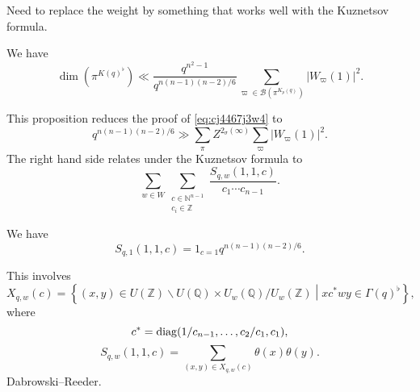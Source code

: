 \documentclass[reqno]{amsart} 
\begin{document}
Need to replace the weight by something that works well with the Kuznetsov formula.

\begin{proposition}
  We have
  \begin{equation*}
    \dim \left( \pi^{K (q)^\flat } \right)
    \ll
    \frac{q^{n^2 - 1}}{q^{n (n - 1) (n - 2)/6}}
    \sum_{\varpi \in \mathcal{B} (\pi^{K_p (q)})}
    \left\lvert W_\varpi (1)  \right\rvert^2.
  \end{equation*}
  
\end{proposition}

This proposition reduces the proof of \eqref{eq:cj4467j3w4} to
\begin{equation*}
  q^{n (n - 1 ) (n - 2) / 6} \gg \sum_\pi Z^{2_\sigma (\infty) }
  \sum_{\varpi} \left\lvert W_\varpi (1)  \right\rvert^2 .
\end{equation*}
The right hand side relates under the Kuznetsov formula to
\begin{equation*}
  \sum_{w \in W}
  \sum_{
    \substack{
      c \in \mathbb{N}^{n - 1 }  \\
       c_i \in \mathbb{Z} 
    }
  }
  \frac{S_{q, w} (1, 1, c)}{ c_1 \dotsb c_{n - 1}}.
\end{equation*}
\begin{lemma}
  We have
  \begin{equation*}
    S_{q, 1} (1, 1, c)
    = 1_{c = 1} q^{n (n - 1 ) (n - 2)/6}.
  \end{equation*}
\end{lemma}
This involves
\begin{equation*}
  X_{q, w} (c) = \left\{ (x, y) \in U (\mathbb{Z} ) \backslash U (\mathbb{Q} ) \times U_w (\mathbb{Q}) / U_w (\mathbb{Z} )
    \middle \vert
    x c^\ast w y \in \Gamma (q)^\flat
  \right\},
\end{equation*}
where
\begin{equation*}
c^\ast = \operatorname{diag}( 1/ c_{n - 1}, \dotsc, c_2 / c_1, c_1 ),
\end{equation*}
\begin{equation*}
  S_{q, w} (1, 1, c)
  = \sum_{(x,y) \in X_{q, w} (c) }
  \theta (x) \theta (y).
\end{equation*}
Dabrowski--Reeder.
\end{document}
